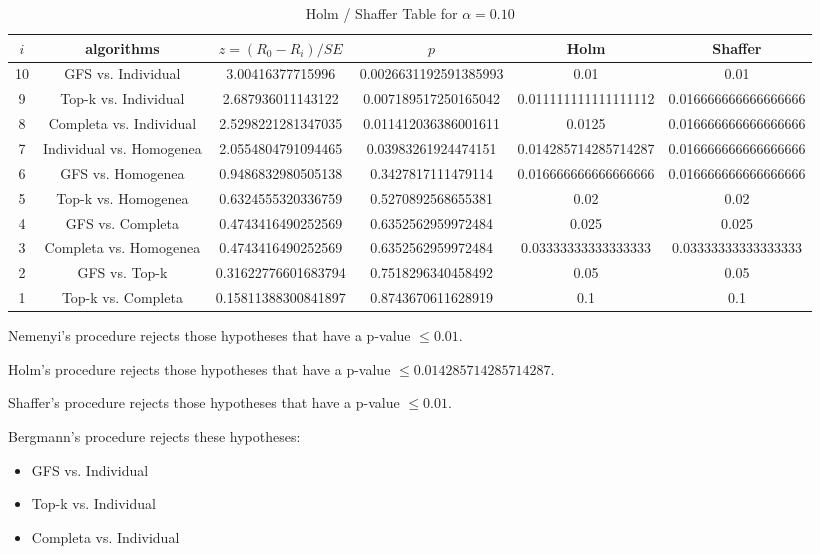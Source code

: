 \documentclass[a4paper,10pt]{article}
\begin{document}
\begin{landscape}
\begin{table}[!htp]
\centering\tiny
\caption{Holm / Shaffer Table for $\alpha=0.10$}
\begin{tabular}{cccccc}
$i$&algorithms&$z=(R_0 - R_i)/SE$&$p$&Holm&Shaffer\\
\hline
10&GFS vs. Individual&3.00416377715996&0.0026631192591385993&0.01&0.01\\
9&Top-k vs. Individual&2.687936011143122&0.007189517250165042&0.011111111111111112&0.016666666666666666\\
8&Completa vs. Individual&2.5298221281347035&0.011412036386001611&0.0125&0.016666666666666666\\
7&Individual vs. Homogenea&2.0554804791094465&0.03983261924474151&0.014285714285714287&0.016666666666666666\\
6&GFS vs. Homogenea&0.9486832980505138&0.3427817111479114&0.016666666666666666&0.016666666666666666\\
5&Top-k vs. Homogenea&0.6324555320336759&0.5270892568655381&0.02&0.02\\
4&GFS vs. Completa&0.4743416490252569&0.6352562959972484&0.025&0.025\\
3&Completa vs. Homogenea&0.4743416490252569&0.6352562959972484&0.03333333333333333&0.03333333333333333\\
2&GFS vs. Top-k&0.31622776601683794&0.7518296340458492&0.05&0.05\\
1&Top-k vs. Completa&0.15811388300841897&0.8743670611628919&0.1&0.1\\
\hline
\end{tabular}
\end{table}
Nemenyi's procedure rejects those hypotheses that have a p-value $\le0.01$.


Holm's procedure rejects those hypotheses that have a p-value $\le0.014285714285714287$.


Shaffer's procedure rejects those hypotheses that have a p-value $\le0.01$.


Bergmann's procedure rejects these hypotheses:


\begin{itemize}


\item GFS vs. Individual
\item Top-k vs. Individual
\item Completa vs. Individual
\end{itemize}



\end{landscape}
\end{document}
